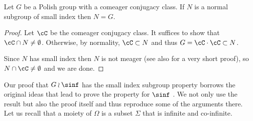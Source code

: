 \begin{lem}\label{nsi} Let $G$ be a Polish group with a comeager conjugacy class. If $N$ is a normal subgroup of small index then $N=G$.
\end{lem}

\begin{proof}Let $\cC$ be the comeager conjugacy class. It suffices to show that $\cC\cap N\neq\emptyset$. Otherwise, by normality, $\cC\subset N$ and thus $G=\cC\cdot\cC\subset N$.

Since $N$ has small index then $N$ is not meager \cite[Th.\,4.1]{MR1231710} (see also \cite[Lem.\,6.8]{Kechris-Rosendal} for a very short proof), so $N\cap\cC\neq\emptyset$ and we are done.\end{proof}

Our proof that $G\wr\sinf$ has the small index subgroup property borrows the original ideas that lead to prove the property for $\sinf$ \cite[Th.\,1]{MR859950}. We not only use the result but also the proof itself and thus reproduce some of the arguments there. Let us recall that a moiety of $\Omega$ is a subset $\Sigma$ that is infinite and co-infinite.

